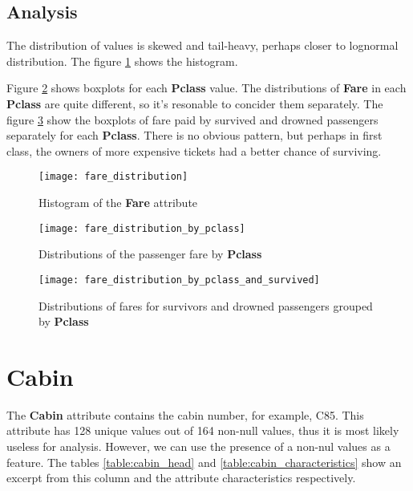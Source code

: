 \subsection{Analysis}
The distribution of values is skewed and tail-heavy, perhaps closer to 
lognormal distribution. The figure \ref{pic:fare_distribution} shows the
histogram.

Figure \ref{pic:fare_distribution_by_pclass} shows boxplots for
each \textbf{Pclass} value. The distributions of \textbf{Fare} in each
\textbf{Pclass} are quite different, so it's resonable to concider them 
separately. The figure \ref{pic:fare_distribution_by_pclass_and_survived}
show the boxplots of fare paid by survived and drowned passengers 
separately for each \textbf{Pclass}. There is no obvious pattern, but 
perhaps in first class, the owners of more expensive tickets had a better 
chance of surviving.

\begin{figure}[!hp]
    \centering
    \texttt{[image: fare\_distribution]}
    \caption{Histogram of the \textbf{Fare} attribute}
    \label{pic:fare_distribution}
\end{figure}

\begin{figure}[!hp]
    \centering
    \texttt{[image: fare\_distribution\_by\_pclass]}
    \caption{Distributions of the passenger fare by \textbf{Pclass}}
    \label{pic:fare_distribution_by_pclass}
\end{figure}

\begin{figure}[!hp]
    \centering
    \texttt{[image: fare\_distribution\_by\_pclass\_and\_survived]}
    \caption{Distributions of fares for survivors and drowned passengers grouped by \textbf{Pclass}}
    \label{pic:fare_distribution_by_pclass_and_survived} 
\end{figure}


\section{Cabin} \label{section:Cabin}
The \textbf{Cabin} attribute contains the cabin number, for example, C85.
This attribute has 128 unique values out of 164 non-null values, thus it 
is most likely useless for analysis. However, we can use the presence of
a non-nul values as a feature. The tables \ref{table:cabin_head} and 
\ref{table:cabin_characteristics} show an excerpt from this column and 
the attribute characteristics respectively.

